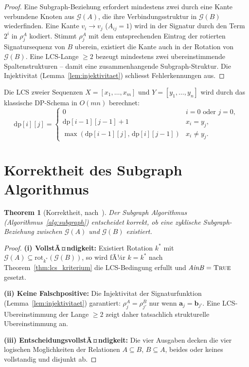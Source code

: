 ﻿\documentclass[12pt, a4paper, titlepage]{report}
\newtheorem{theorem}{Theorem}[section]
\theoremstyle{definition}
\theoremstyle{remark}
\begin{document}
\begin{proof}
Eine Subgraph-Beziehung erfordert mindestens zwei durch eine Kante verbundene
Knoten aus $\mathcal{G}(A)$, die ihre Verbindungsstruktur in $\mathcal{G}(B)$
wiederfinden. Eine Kante $v_i \to v_j$ ($A_{ij}=1$) wird in der Signatur durch
den Term $2^i$ in $\rho_j^A$ kodiert. Stimmt $\rho_j^A$ mit dem entsprechenden
Eintrag der rotierten Signatursequenz von $B$ uberein, existiert die Kante auch
in der Rotation von $\mathcal{G}(B)$. Eine LCS-Lange $\geq 2$ bezeugt mindestens
zwei ubereinstimmende Spaltenstrukturen -- damit eine zusammenhangende Subgraph-Struktur.
Die Injektivitat (Lemma~\ref{lem:injektivitaet}) schliesst Fehlerkennungen aus.
\end{proof}

Die LCS zweier Sequenzen $X = [x_1,\ldots,x_m]$ und $Y = [y_1,\ldots,y_n]$ wird
durch das klassische DP-Schema in $O(mn)$ berechnet:
\begin{equation}
  \mathrm{dp}[i][j] = \begin{cases}
    0 & i=0 \text{ oder } j=0, \\
    \mathrm{dp}[i-1][j-1]+1 & x_i = y_j, \\
    \max(\mathrm{dp}[i-1][j],\,\mathrm{dp}[i][j-1]) & x_i \neq y_j.
  \end{cases}
  \label{eq:lcs_dp}
\end{equation}

\section{Korrektheit des Subgraph Algorithmus}

\begin{theorem}[Korrektheit, nach~\citep{epp2026subgraph}]
\label{thm:korrektheit_subgraph}
Der Subgraph Algorithmus (Algorithmus~\ref{alg:subgraph}) entscheidet korrekt,
ob eine zyklische Subgraph-Beziehung zwischen $\mathcal{G}(A)$ und $\mathcal{G}(B)$ existiert.
\end{theorem}

\begin{proof}
\textbf{(i) VollstÃ¤ndigkeit:} Existiert Rotation $k^*$ mit
$\mathcal{G}(A) \subseteq \mathrm{rot}_{k^*}(\mathcal{G}(B))$, so wird fÃ¼r $k=k^*$
nach Theorem~\ref{thm:lcs_kriterium} die LCS-Bedingung erfullt und
$\mathit{AinB}=\textsc{True}$ gesetzt.

\textbf{(ii) Keine Falschpositive:} Die Injektivitat der Signaturfunktion
(Lemma~\ref{lem:injektivitaet}) garantiert: $\rho_j^A = \rho_{j'}^B$ nur wenn
$\bm{a}_j = \bm{b}_{j'}$. Eine LCS-Ubereinstimmung der Lange $\geq 2$ zeigt daher
tatsachlich strukturelle Ubereinstimmung an.

\textbf{(iii) EntscheidungsvollstÃ¤ndigkeit:} Die vier Ausgaben decken die vier
logischen Moglichkeiten der Relationen $A \subseteq B$, $B \subseteq A$, beides
oder keines vollstandig und disjunkt ab.
\end{proof}
\end{document}
